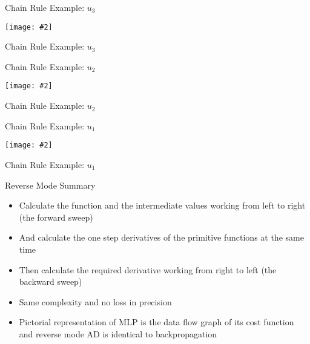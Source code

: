 \documentclass{beamer}
\newcommand {\framedgraphic}[2] {
    \begin{frame}{#1}
        \begin{center}
            \texttt{[image: \#2]}
        \end{center}
    \end{frame}
}
\begin{document}
\framedgraphic{Chain Rule Example: $u_3$}{diagrams/Fita3.png}

\begin{frame}[fragile]{Chain Rule Example: $u_3$}


\end{frame}

\framedgraphic{Chain Rule Example: $u_2$}{diagrams/Fita3.png}

\begin{frame}[fragile]{Chain Rule Example: $u_2$}

\end{frame}

\framedgraphic{Chain Rule Example: $u_1$}{diagrams/Fita3.png}

\begin{frame}[fragile]{Chain Rule Example: $u_1$}

\end{frame}

\begin{frame}[fragile]{Reverse Mode Summary}

\begin{itemize}
\pause
\item Calculate the function and the intermediate values working from
  left to right (the forward sweep)
\pause
\item And calculate the one step derivatives of the
  primitive functions at the same time
\pause
\item Then calculate the required derivative working from right to
  left (the backward sweep)
\pause
\item Same complexity and no loss in precision
\pause
\item Pictorial representation of MLP is the data flow graph of its cost
  function and reverse mode AD is identical to backpropagation
\end{itemize}

\end{frame}
\end{document}
